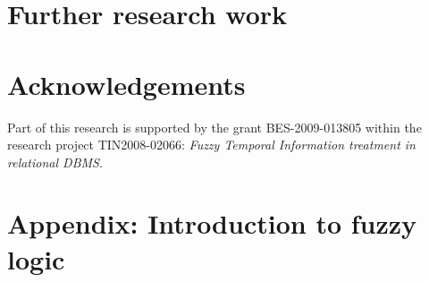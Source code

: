 \documentclass[graybox]{svmult}
\begin{document}
\section{Further research work}
\label{sec:further-research-work}


\section*{Acknowledgements}
Part of this research is supported by the grant BES-2009-013805 within the research project TIN2008-02066: \emph{Fuzzy Temporal Information treatment in relational DBMS}.




\section*{Appendix: Introduction to fuzzy logic}
\label{app:fuzzy-logic}

\end{document}

